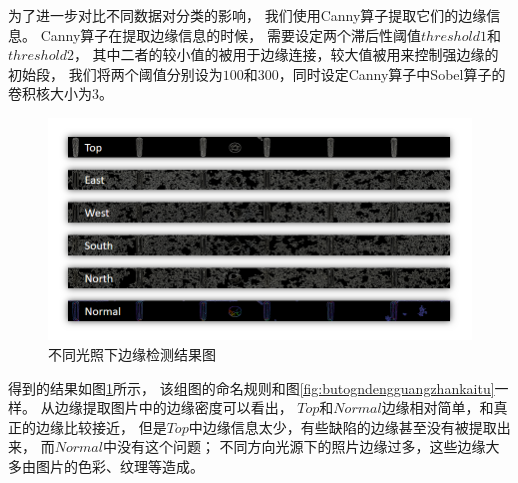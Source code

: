 为了进一步对比不同数据对分类的影响，
我们使用Canny\cite{canny1983finding}算子提取它们的边缘信息。
Canny算子在提取边缘信息的时候，
需要设定两个滞后性阈值$threshold1$和$threshold2$，
其中二者的较小值的被用于边缘连接，较大值被用来控制强边缘的初始段，
我们将两个阈值分别设为$100$和$300$，同时设定Canny算子中Sobel算子的卷积核大小为$3$。
\begin{figure}[htbp]
\centering
\includegraphics[width=1.0\linewidth]{figures/butongdengguangcanny.png}
\caption{不同光照下边缘检测结果图}
\label{fig:butongdengguangcanny}
\end{figure}
得到的结果如图\ref{fig:butongdengguangcanny}所示，
该组图的命名规则和图\ref{fig:butogndengguangzhankaitu}一样。
从边缘提取图片中的边缘密度可以看出，
$Top$和$Normal$边缘相对简单，和真正的边缘比较接近，
但是$Top$中边缘信息太少，有些缺陷的边缘甚至没有被提取出来，
而$Normal$中没有这个问题；
不同方向光源下的照片边缘过多，这些边缘大多由图片的色彩、纹理等造成。


